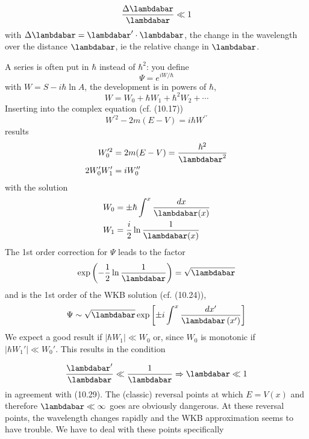 \begin{equation}
    \frac{\Delta\lambdabar}{\lambdabar}\ll 1
\end{equation}
with $\Delta\lambdabar=\lambdabar'\cdot\lambdabar$, the change in the wavelength over the distance $\lambdabar$, ie the relative change in $\lambdabar$.\par
A series is often put in $\hbar$ instead of $\hbar^2$: you define
\begin{equation}
    \Psi=e^{i W / \hbar}
    \end{equation}
with $W = S - i \hbar \operatorname{ln} A$, the development is in powers of $\hbar$,
\begin{equation}
    W=W_{0}+\hbar W_{1}+\hbar^{2} W_{2}+\cdots
    \end{equation}
Inserting into the complex equation (cf. (10.17))
\begin{equation}
    W^{\prime 2}-2 m(E-V)=i \hbar W^{\prime \prime}
    \end{equation}
results
\begin{align} W_{0}^{\prime 2} &=2 m(E-V)=\frac{\hbar^{2}}{\lambdabar^{2}} \\ 2 W_{0}^{\prime} W_{1}^{\prime} &=i W_{0}^{\prime \prime} \end{align}
with the solution
%
\begin{equation}
\begin{aligned} W_{0} &=\pm \hbar \int^{x} \frac{d x}{\lambdabar(x)} \\ W_{1} &=\frac{i}{2} \ln \frac{1}{\lambdabar(x)} \end{aligned}
\end{equation}
The 1st order correction for $\Psi$ leads to the factor
\begin{equation}
    \exp \left(-\frac{1}{2} \ln \frac{1}{\lambdabar}\right)=\sqrt{\lambdabar}
    \end{equation}
and is the 1st order of the WKB solution (cf. (10.24)),
\begin{equation}
    \Psi \sim \sqrt{\lambdabar} \exp \left[\pm i \int^{x} \frac{d x^{\prime}}{\lambdabar\left(x^{\prime}\right)}\right]
    \end{equation}
We expect a good result if $|\hbar W_1|\ll W_0$ or, since $W_0$ is monotonic if $| \hbar W_1' | \ll W_0'$. This results in the condition

\begin{equation}
    \frac{\lambdabar^{\prime}}{\lambdabar} \ll \frac{1}{\lambdabar} \Rightarrow \lambdabar \ll 1
    \end{equation}
in agreement with (10.29). The (classic) reversal points at which $E = V (x)$ and therefore $\lambdabar\ll\infty$ goes are obviously dangerous. At these reversal points, the wavelength changes rapidly and the WKB approximation seems to have trouble. We have to deal with these points specifically

